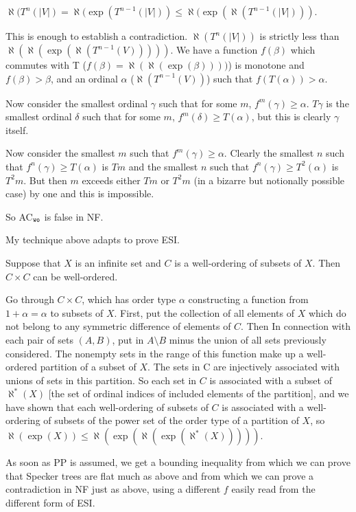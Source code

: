 \documentclass[12pt]{article}
\begin{document}
$\aleph(T^n(|V|) = \aleph(\exp(T^{n-1}(|V|)) \leq \aleph(\exp(\aleph(T^{n-1}(|V|)))$.

This is enough to establish a contradiction.  $\aleph(T^n(|V|))$ is strictly less than $\aleph(\aleph(\exp(\aleph(T^{n-1}(V)))))$.  We have a function $f(\beta)$ which commutes with T ($f(\beta)=\aleph(\aleph(\exp(\beta))))$) is monotone and $f(\beta)>\beta$, and an ordinal $\alpha$ ($\aleph(T^{n-1}(V))$) such that $f(T(\alpha)) > \alpha$.

Now consider the smallest ordinal $\gamma$ such that for some $m$, $f^m(\gamma)\geq \alpha$.
$T\gamma$ is the smallest ordinal $\delta$ such that for some $m$, $f^m(\delta)\geq T(\alpha)$, but this is clearly
$\gamma$ itself.

Now consider the smallest $m$ such that $f^m(\gamma)\geq\alpha$.  Clearly the smallest $n$ such that
$f^n(\gamma)\geq T(\alpha)$ is $Tm$ and the smallest $n$ such that  $f^n(\gamma)\geq T^2(\alpha)$ is $T^2m$.  But then $m$ exceeds either $Tm$ or $T^2m$ (in a bizarre but notionally possible case) by one and this is impossible.

So AC$_{\tt wo}$ is false in NF.

My technique above adapts to prove ESI.

Suppose that $X$ is an infinite  set and $C$ is a well-ordering of subsets of $X$.  Then $C \times C$ can be well-ordered.

Go through $C\times C$, which has order type $\alpha$ constructing a function from $1+\alpha=\alpha$ to subsets of $X$.  First, put the collection of all elements of $X$ which do not belong to any symmetric difference of elements of $C$. Then In connection with each pair of sets $(A,B)$, put in $A \setminus B$ minus the union of all sets previously considered.  The nonempty sets in the range of this function make up a well-ordered partition of a subset of $X$.  The sets in C are injectively associated with unions of sets in this partition.  So each set in $C$ is associated with a subset of $\aleph^*(X)$ [the set of ordinal indices of included elements of the partition], and we have
shown that each well-ordering of subsets of $C$ is associated with a well-ordering of subsets of the power set of the order type of a partition of $X$, so $\aleph(\exp(X)) \leq \aleph(\exp(\aleph(\exp(\aleph^*(X)))))$.

As soon as PP is assumed, we get a bounding inequality from which we can prove that Specker trees are flat much as above and from which we can prove a contradiction in NF just as above, using a different $f$ easily read from the different form of ESI.
\end{document}
